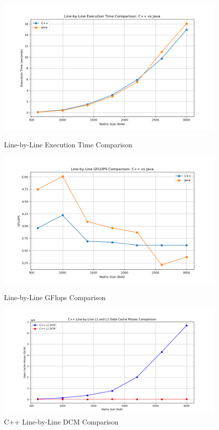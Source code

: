 \documentclass{article}
\begin{document}
\begin{figure}[H]
    \centering
    \begin{minipage}{0.32\textwidth}
        \centering
        \includegraphics[width=\textwidth]{Figure_4.png}
        \caption{\small Line-by-Line Execution Time Comparison}
        \label{fig:execution_time_lineByline}
    \end{minipage}
    \hfill
    \begin{minipage}{0.32\textwidth}
        \centering
        \includegraphics[width=\textwidth]{Figure_5.png}
        \caption{\small Line-by-Line GFlops Comparison}
        \label{fig:flops_lineByline}
    \end{minipage}
    \hfill
    \begin{minipage}{0.32\textwidth}
        \centering
        \includegraphics[width=\textwidth]{Figure_6.png}
        \caption{\small C++ Line-by-Line DCM Comparison}
        \label{fig:cache_misses_lineByline}
    \end{minipage}
\end{figure}
\end{document}
